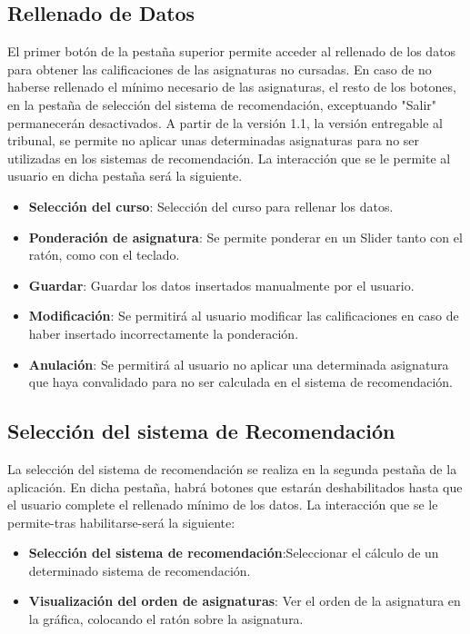 \subsection{Rellenado de Datos}
El primer botón de la pestaña superior permite acceder al rellenado de los datos para obtener las calificaciones de las asignaturas no cursadas. En caso de no haberse rellenado el mínimo necesario de las asignaturas, el resto de los botones, en la pestaña de selección del sistema de recomendación, exceptuando "Salir" permanecerán desactivados.  A partir de la versión 1.1, la versión entregable al tribunal, se permite no aplicar unas determinadas asignaturas para no ser utilizadas en los sistemas de recomendación. 
La interacción que se le permite al usuario en dicha pestaña será la siguiente. 
\begin{itemize}
\item \textbf{Selección del curso}: Selección del curso para rellenar los datos. 
\item \textbf{Ponderación de asignatura}: Se permite ponderar en un Slider tanto con el ratón, como con el teclado.
\item \textbf{Guardar}: Guardar los datos insertados  manualmente  por el usuario. 
\item \textbf{Modificación}: Se permitirá al usuario modificar las calificaciones en caso de haber insertado incorrectamente la ponderación. 
\item \textbf{Anulación}: Se permitirá al usuario no aplicar una determinada asignatura que haya convalidado para no ser calculada en el sistema de recomendación. 
\end{itemize}

\subsection{Selección del sistema de Recomendación}
La selección del sistema de recomendación se realiza en la segunda pestaña de la aplicación. En dicha pestaña, habrá botones que  estarán deshabilitados hasta que el usuario complete el rellenado mínimo de los datos. 
La interacción que se le permite-tras habilitarse-será la siguiente: 
\begin{itemize}
\item \textbf{Selección del sistema de recomendación}:Seleccionar el cálculo de un determinado sistema de recomendación. 
\item \textbf{Visualización del orden de asignaturas}: Ver el orden de la asignatura en la gráfica, colocando el ratón sobre la asignatura. 
\end{itemize}

